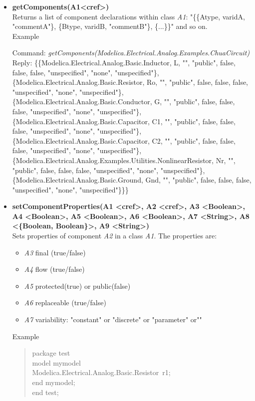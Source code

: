 \documentclass[11pt,a4paper,oneside,english]{book}
\newenvironment{modelicaExamples}{\begin{itemize}}{\end{itemize}}
\newcommand{\api}[2]{\item \textbf{#1} \\ #2}
\newcommand{\tab}{\hspace{2em}}
\newcommand{\command}[1]{Command: \textit{#1}\\}
\newcommand{\reply}[1]{Reply: #1}
\newcommand{\functionex}[2]{\begin{singlespace} \command{#1} \reply{#2} \end{singlespace}}
\newcommand{\examples}{Example}
\newenvironment{mocode}{\begin{verse}\begin{singlespace}\begin{scriptsize}\ttfamily}{\end{scriptsize}\end{singlespace}\end{verse}}
\begin{document}
\begin{modelicaExamples}
		\api{getComponents(A1<cref>)}{Returns a list of component declarations within class \textit{A1}:  "\{\{Atype, varidA, "commentA"\}, \{Btype, varidB, "commentB"\},  \{...\}\}" and so on.\\
		\examples
		\functionex{getComponents(Modelica.Electrical.Analog.Examples.Chua\-Cir\-cuit)}
		{\{\{Modelica.Electrical.Analog.Basic.Inductor, L, "", "pu\-blic", fal\-se, fal\-se, fal\-se, "un\-spe\-ci\-fi\-ed", "none", "unspecified"\},\\
\tab \{Modelica.Electrical.Analog.Basic.Resistor, Ro, "", "public", fal\-se, fal\-se, fal\-se, "unspecified", "none", "unspecified"\},\\
\tab \{Modelica.Electrical.Analog.Basic.Conductor, G, "", "public", fal\-se, fal\-se, fal\-se, "unspecified", "none", "unspecified"\},\\
\tab \{Modelica.Electrical.Analog.Basic.Capacitor, C1, "", "public", fal\-se, fal\-se, fal\-se, "unspecified", "none", "unspecified"\},\\
\tab \{Modelica.Electrical.Analog.Basic.Capacitor, C2, "", "public", fal\-se, fal\-se, fal\-se, "unspecified", "none", "unspecified"\},\\
\tab \{Modelica.Electrical.Analog.Examples.Utilities.Non\-li\-ne\-ar\-Re\-si\-stor, Nr, "", \\"pu\-blic", fal\-se, fal\-se, fal\-se, "unspecified", "none", "unspecified"\},\\
\tab \{Modelica.Electrical.Analog.Basic.Ground, Gnd, "", "public", fal\-se, fal\-se, fal\-se, "unspecified", "none", "unspecified"\}\}\}
		}
		}
		
		
		\api{setComponentProperties(A1 <cref>, A2 <cref>, A3 <Bo\-o\-le\-an>, A4 <Bo\-o\-le\-an>, A5 <Bo\-o\-le\-an>, A6 <Bo\-o\-le\-an>, A7 <String>, A8 <\{Bo\-o\-le\-an, Bo\-o\-le\-an\}>, A9 <String>)}{Sets properties of component \textit{A2} in a class \textit{A1}. The properties are:
\begin{itemize}
	\item\textit{A3} final (true/false)
		\item\textit{A4} flow (true/false)
	        \item\textit{A5} protected(true) or public(false)
		\item\textit{A6} replaceable (true/false)
		\item\textit{A7} variability: "constant" or "discrete" or "parameter" or""
\end{itemize}
\examples
\begin{mocode}
		package test\\
		\tab model mymodel\\
		\tab\tab Modelica.Electrical.Analog.Basic.Re\-si\-stor~r1;\\
		\tab end mymodel;\\
		end test;\\
		\end{mocode}

}
\end{modelicaExamples}
\end{document}

